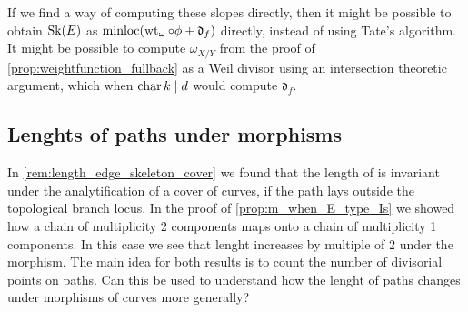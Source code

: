 If we find a way of computing these slopes directly, then it might be possible to obtain  $\operatorname{Sk}(E)$ as $\minloc (\wt_{\omega} \circ \phi + \mathfrak{d}_f)$ directly, instead of using Tate's algorithm. 
It might be possible to compute $\omega_{X / Y}$ from the proof of \cref{prop:weightfunction_fullback} as a Weil divisor using an intersection theoretic argument, which when $\operatorname{char} k \mid d$ would compute  $\mathfrak{d} _f$. 


\subsection*{Lenghts of paths under morphisms} \label{sec:lenghts_of_paths_under_morphisms}

In \cref{rem:length_edge_skeleton_cover} we found that the length of is invariant under the analytification of a cover of curves, if the path lays outside the topological branch locus. 
In the proof of \cref{prop:m_when_E_type_Is} we showed how a chain of multiplicity 2 components maps onto a chain of multiplicity 1 components. In this case we see that lenght increases by multiple of 2 under the morphism. 
The main idea for both results is to count the number of divisorial points on paths. Can this be used to understand how the lenght of paths changes under morphisms of curves more generally?

